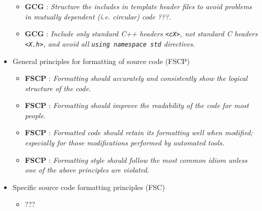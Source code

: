 \begin{itemize}
\begin{itemize}
  {}\item{}\textbf{GCG
  {}}: {}\textit{Structure the includes in template
  header files to avoid problems in mutually dependent (i.e. circular) code
  ???.}

  {}\item{}\textbf{GCG
  {}}: {}\textit{Include only standard C++ headers
  {}\texttt{<cX>}, not standard C headers {}\texttt{<X.h>}, and avoid all
  {}\texttt{using namespace std} directives.}

  \end{itemize}

\item General principles for formatting of source code (FSCP)

  \setcounter{Thyra_FSCP_counter}{0}

  \begin{itemize}

  {}\item{}\textbf{FSCP
  {}}: {}\textit{Formatting should accurately and
  consistently show the logical structure of the code.}

  {}\item{}\textbf{FSCP
  {}}: {}\textit{Formatting should improve the
  readability of the code for most people.}

  {}\item{}\textbf{FSCP
  {}}: {}\textit{Formatted code should retain its
  formatting well when modified; especially for those modifications performed
  by automated tools.}

  {}\item{}\textbf{FSCP
  {}}: {}\textit{Formatting style should follow the
  most common idiom unless one of the above principles are violated.}

  \end{itemize}

\item Specific source code formatting principles (FSC)

  \begin{itemize}

  \item ???

  \end{itemize}


\end{itemize}
